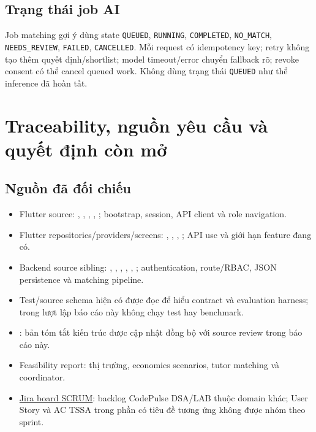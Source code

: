 \documentclass[11pt,a4paper]{article}
\begin{document}
\subsection{Trạng thái job AI}
Job matching gợi ý dùng state \texttt{QUEUED}, \texttt{RUNNING}, \texttt{COMPLETED}, \texttt{NO\_MATCH}, \texttt{NEEDS\_REVIEW}, \texttt{FAILED}, \texttt{CANCELLED}. Mỗi request có idempotency key; retry không tạo thêm quyết định/shortlist; model timeout/error chuyển fallback rõ; revoke consent có thể cancel queued work. Không dùng trạng thái \texttt{QUEUED} như thể inference đã hoàn tất.

\section{Traceability, nguồn yêu cầu và quyết định còn mở}

\subsection{Nguồn đã đối chiếu}
\begin{itemize}
  \item Flutter source: , , , , ; bootstrap, session, API client và role navigation.
  \item Flutter repositories/providers/screens: , , , ; API use và giới hạn feature đang có.
  \item Backend source sibling: , , , , , ; authentication, route/RBAC, JSON persistence và matching pipeline.
  \item Test/source schema hiện có được đọc để hiểu contract và evaluation harness; trong lượt lập báo cáo này không chạy test hay benchmark.
  \item {}: bản tóm tắt kiến trúc được cập nhật đồng bộ với source review trong báo cáo này.
  \item Feasibility report: thị trường, economics scenarios, tutor matching và coordinator.
  \item \href{https://hcmut1.atlassian.net/jira/software/projects/SCRUM/boards/1}{Jira board SCRUM}: backlog CodePulse DSA/LAB thuộc domain khác; User Story và AC TSSA trong phần có tiêu đề tương ứng không được nhóm theo sprint.
\end{itemize}
\end{document}
